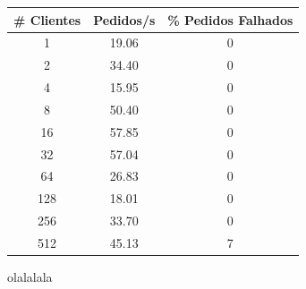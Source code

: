 
\begin{tabular}{|c|c|c|}
\hline
\textbf{\# Clientes} & \textbf{Pedidos/s} & \textbf{\% Pedidos Falhados} \\ \hline
1 & 19.06 & 0 \\ \hline
2 & 34.40 & 0 \\ \hline
4 & 15.95 & 0 \\ \hline
8 & 50.40 & 0 \\ \hline
16 & 57.85 & 0 \\ \hline
32 & 57.04 & 0 \\ \hline
64 & 26.83 & 0 \\ \hline
128 & 18.01 & 0 \\ \hline
256 & 33.70 & 0 \\ \hline
512 & 45.13 & 7 \\ \hline

\end{tabular}

olalalala
